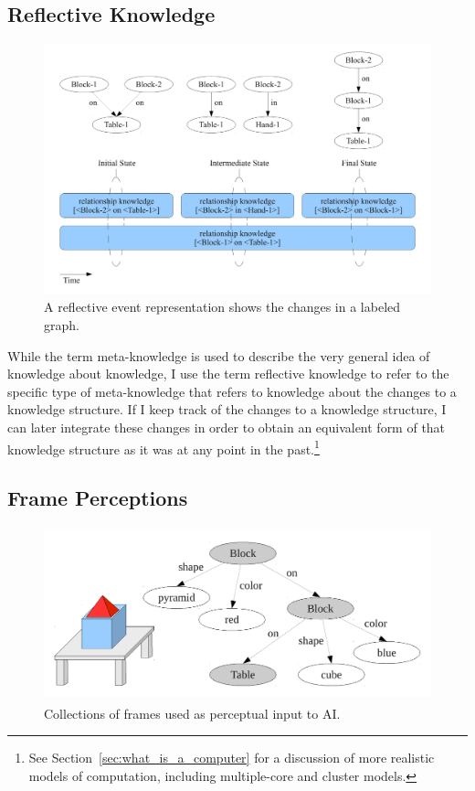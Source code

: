 \subsection{Reflective Knowledge}

\begin{figure}[bth]
  \center
  \includegraphics[width=12cm]{gfx/reflective_event_representation}
  \caption[A reflective event representation]{A reflective event representation shows the changes in a labeled graph.}
  \label{fig:reflective_event_representation}
\end{figure}


While the term meta-knowledge is used to describe the very general
idea of knowledge about knowledge, I use the term reflective knowledge
to refer to the specific type of meta-knowledge that refers to
knowledge about the changes to a knowledge structure.  If I keep track
of the changes to a knowledge structure, I can later integrate these
changes in order to obtain an equivalent form of that knowledge
structure as it was at any point in the past.\footnote{See
  Section~\ref{sec:what_is_a_computer} for a discussion of more
  realistic models of computation, including multiple-core and cluster
  models.}


\subsection{Frame Perceptions}

\begin{figure}[bth]
  \center
  \includegraphics[height=5cm]{gfx/frame_perception}
  \caption[Collections of frames used as perceptual input to AI]{Collections of frames used as perceptual input to AI.}
  \label{fig:frame_perception}
\end{figure}

